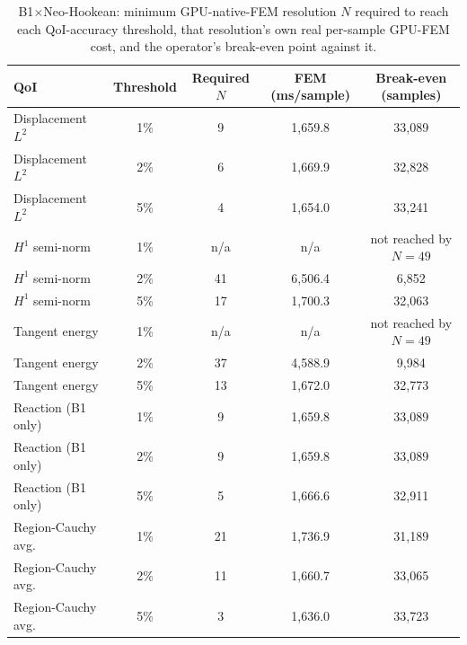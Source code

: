 \documentclass[final,5p,times]{elsarticle}
\begin{document}
\begin{table}[ht]
\centering
\caption{B1$\times$Neo-Hookean: minimum GPU-native-FEM resolution $N$
  required to reach each QoI-accuracy threshold, that resolution's own
  real per-sample GPU-FEM cost, and the operator's break-even point
  against it.}
\label{tab:b2-b1nh}
\small
\begin{tabular}{lcccc}
\toprule
QoI & Threshold & Required $N$ & FEM (ms/sample) & Break-even (samples) \\
\midrule
Displacement $L^2$  & 1\% & 9   & 1{,}659.8 & 33{,}089 \\
Displacement $L^2$  & 2\% & 6   & 1{,}669.9 & 32{,}828 \\
Displacement $L^2$  & 5\% & 4   & 1{,}654.0 & 33{,}241 \\
$H^1$ semi-norm     & 1\% & n/a & n/a       & not reached by $N{=}49$ \\
$H^1$ semi-norm     & 2\% & 41  & 6{,}506.4 & 6{,}852 \\
$H^1$ semi-norm     & 5\% & 17  & 1{,}700.3 & 32{,}063 \\
Tangent energy      & 1\% & n/a & n/a       & not reached by $N{=}49$ \\
Tangent energy      & 2\% & 37  & 4{,}588.9 & 9{,}984 \\
Tangent energy      & 5\% & 13  & 1{,}672.0 & 32{,}773 \\
Reaction (B1 only)  & 1\% & 9   & 1{,}659.8 & 33{,}089 \\
Reaction (B1 only)  & 2\% & 9   & 1{,}659.8 & 33{,}089 \\
Reaction (B1 only)  & 5\% & 5   & 1{,}666.6 & 32{,}911 \\
Region-Cauchy avg.\ & 1\% & 21  & 1{,}736.9 & 31{,}189 \\
Region-Cauchy avg.\ & 2\% & 11  & 1{,}660.7 & 33{,}065 \\
Region-Cauchy avg.\ & 5\% & 3   & 1{,}636.0 & 33{,}723 \\
\bottomrule
\end{tabular}
\end{table}
\end{document}
